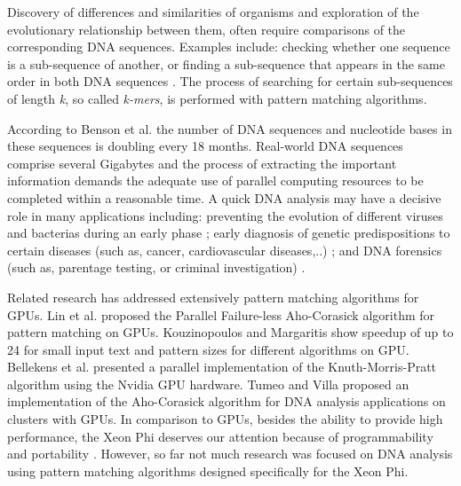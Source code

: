\documentclass[conference]{IEEEtran}
\begin{document}
Discovery of differences and similarities of organisms and exploration of the evolutionary relationship between them, often require comparisons of the corresponding DNA sequences. Examples include: checking whether one sequence is a sub-sequence of another, or finding a sub-sequence that appears in the same order in both DNA sequences \cite{Bentley01102000}. The process of searching for certain sub-sequences of length \emph{k}, so called \emph{k-mers}, is performed with pattern matching algorithms. 

According to Benson et al. \cite{benson2013genbank} the number of DNA sequences and nucleotide bases in these sequences is doubling every 18 months. Real-world DNA sequences comprise several Gigabytes and the process of extracting the important information demands the adequate use of parallel computing resources to be completed within a reasonable time. A quick DNA analysis may have a decisive role in many applications including: preventing the evolution of different viruses and bacterias during an early phase \cite{collins2003vision}; early diagnosis of genetic predispositions to certain diseases (such as, cancer, cardiovascular diseases,..) \cite{mellmann2011prospective}; and DNA forensics (such as, parentage testing, or criminal investigation) \cite{luftig2000dna}.

Related research has addressed extensively pattern matching algorithms for GPUs. Lin et al. \cite{Lin_PFA-C_Algo} proposed the Parallel Failure-less Aho-Corasick algorithm for pattern matching on GPUs. Kouzinopoulos and Margaritis \cite{kouzinopoulos2009string} show speedup of up to 24 for small input text and pattern sizes for different algorithms on GPU. Bellekens et al. \cite{bellekens2013investigation} presented a parallel implementation of the Knuth-Morris-Pratt algorithm using the Nvidia GPU hardware. Tumeo and Villa \cite{Tumeo_DNA_GPU} proposed an implementation of the Aho-Corasick algorithm for DNA analysis applications on clusters with GPUs. In comparison to GPUs, besides the ability to provide high performance, the Xeon Phi deserves our attention because of programmability \cite{DokulilBBPSB13,PllanaBMNX08} and portability \cite{KesslerDTNRDBTP12}. However, so far not much research was focused on DNA analysis using pattern matching algorithms designed specifically for the Xeon Phi.
\end{document}
